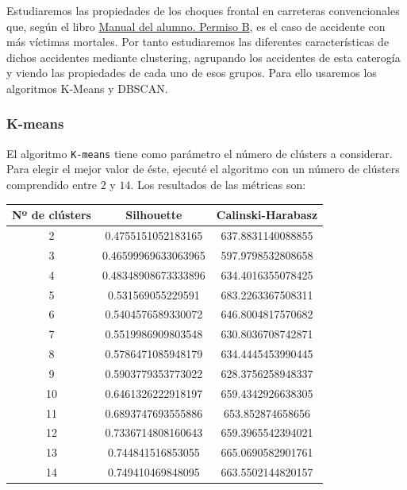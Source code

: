 \documentclass[a4]{article}
\begin{document}
Estudiaremos las propiedades de los choques frontal en carreteras convencionales que, según el libro \href{https://www.todostuslibros.com/libros/manual-del-alumno-permiso-b-facilauto_978-84-09-08551-4}{Manual del alumno. Permiso B}, es el caso de accidente con más víctimas mortales. Por tanto estudiaremos las diferentes características de dichos accidentes mediante clustering, agrupando los accidentes de esta caterogía y viendo las propiedades de cada uno de esos grupos. Para ello usaremos los algoritmos K-Means y DBSCAN.

\subsubsection{K-means}

El algoritmo \texttt{K-means} tiene como parámetro el número de clústers a considerar. Para elegir el mejor valor de éste, ejecuté el algoritmo con un número de clústers comprendido entre $2$ y $14$. Los resultados de las métricas son:

\begin{center}
\begin{tabular}{|c|c|c|}
\hline
\multicolumn{1}{|c|}{\textbf{Nº de clústers}}& \textbf{Silhouette} & \textbf{Calinski-Harabasz}\\ \hline
  2  & 0.4755151052183165  & 637.8831140088855  \\ \hline
  3  & 0.46599969633063965 & 597.9798532808658  \\ \hline
  4  & 0.48348908673333896 & 634.4016355078425  \\ \hline
  5  & 0.531569055229591   & 683.2263367508311  \\ \hline
  6  & 0.5404576589330072  & 646.8004817570682  \\ \hline
  7  & 0.5519986909803548  & 630.8036708742871  \\ \hline
  8  & 0.5786471085948179  & 634.4445453990445  \\ \hline
  9  & 0.5903779353773022  & 628.3756258948337  \\ \hline
 10  & 0.6461326222918197  & 659.4342926638305  \\ \hline
 11  & 0.6893747693555886  & 653.852874658656   \\ \hline
 12  & 0.7336714808160643  & 659.3965542394021  \\ \hline
 13  & 0.744841516853055   & 665.0690582901761  \\ \hline
 14  & 0.749410469848095   & 663.5502144820157  \\ \hline
\end{tabular}
\end{center}
\end{document}
